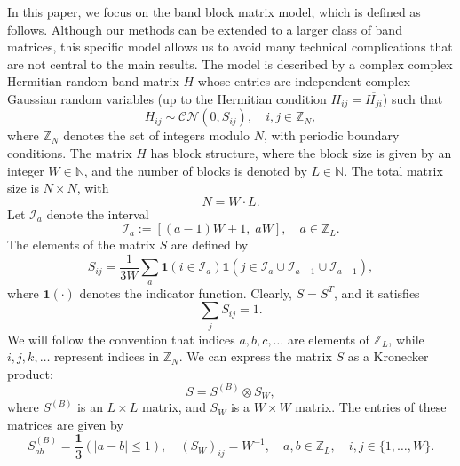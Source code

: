 \documentclass[10pt,reqno]{article}
\theoremstyle{plain} %
\theoremstyle{remark}
\numberwithin{equation}{section}
\begin{document}
 In this paper, we focus on the band block matrix model, which is defined as follows. Although our methods can be extended to a larger class of band matrices, this specific model allows us to avoid many technical complications that are not central to the main results.
The model is described by a complex complex Hermitian random band matrix \( H \) whose entries  are independent complex Gaussian random variables (up to the Hermitian condition $H_{ij}=\overline{ H_{ji}}$) such that
\[
H_{ij} \sim \mathcal{CN}(0, S_{ij}), \quad  i,j \in \mathbb{Z}_N,
\]
where \( \mathbb{Z}_N \) denotes the set of integers modulo \( N \), with periodic boundary conditions.  
The matrix \( H \) has block structure, where the block size is given by an integer \( W \in \mathbb{N} \), and the number of blocks is denoted by \( L \in \mathbb{N} \). The total matrix size is \( N \times N \), with
\[
N = W \cdot L.
\]
Let \( \mathcal{I}_a \) denote the interval
\[
\mathcal{I}_a := \left[ (a-1)W + 1, \; aW \right], \quad a \in \mathbb{Z}_L.
\]
The elements of the matrix \( S \) are defined by
\[
S_{ij} = \frac{1}{3W} \sum_a \mathbf{1}(i \in \mathcal{I}_a) \mathbf{1}(j \in \mathcal{I}_a \cup \mathcal{I}_{a+1} \cup \mathcal{I}_{a-1}),
\]
where \( \mathbf{1}(\cdot) \) denotes the indicator function. Clearly, \( S = S^T \), and it satisfies
\[
\sum_j S_{ij} = 1.
\]
We will follow the convention that indices \( a, b, c, \dots \) are elements of \( \mathbb{Z}_L \), while \( i, j, k, \dots \) represent indices in \( \mathbb{Z}_N \). We can express the matrix \( S \) as a Kronecker product:
\[
S = S^{(B)} \otimes S_W,
\]
where \( S^{(B)} \) is an \( L \times L \) matrix, and \( S_W \) is a \( W \times W \) matrix. The entries of these matrices are given by
\[
S^{(B)}_{ab} = \frac{\mathbf{1}}{3}(|a-b| \le 1), \quad (S_W)_{ij} = W^{-1}, \quad a, b \in \mathbb{Z}_L, \quad i, j \in \{1, \dots, W\}.
\]

 
\end{document}
